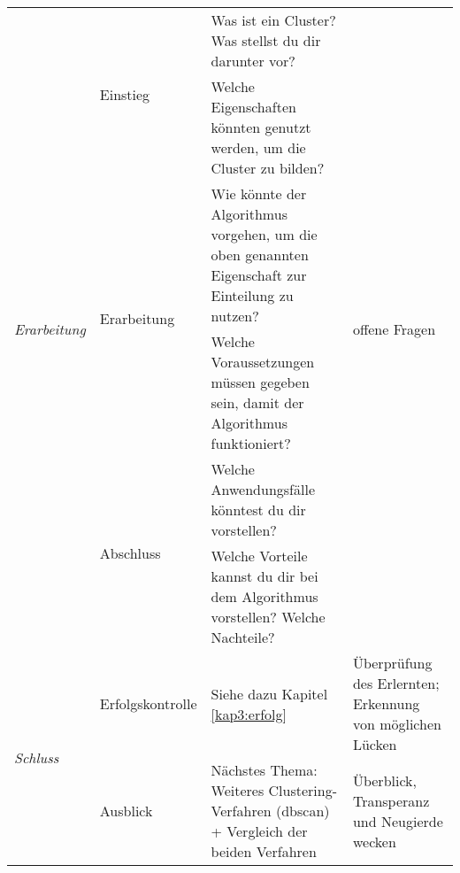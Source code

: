 \begin{longtable}[c]{@{}lp{3.5cm}p{4.5cm}p{4.0cm}@{}}
	\multirow{6}{*}{\textit{Erarbeitung}} & \multirow{2}{*}{Einstieg}     & Was ist ein Cluster? Was stellst du dir darunter vor?                                                                                                     & \multirow{6}{*}{offene Fragen}                                    \\* \cmidrule(lr){3-3}
	&                                              & Welche Eigenschaften könnten genutzt werden, um die Cluster zu bilden?                                                                                    &                                                                   \\* \cmidrule(lr){2-3}
	& \multirow{2}{*}{Erarbeitung} & Wie könnte der Algorithmus vorgehen, um die oben genannten Eigenschaft zur Einteilung zu nutzen?                                                          &                                                                   \\* \cmidrule(lr){3-3}
	&                                              & Welche Voraussetzungen müssen gegeben sein, damit der Algorithmus funktioniert?                                                                           &                                                                   \\* \cmidrule(lr){2-3}
	& \multirow{2}{*}{Abschluss}                   & Welche Anwendungsfälle könntest du dir vorstellen?                                                                                                        &                                                                   \\* \cmidrule(lr){3-3}
	&                                              & Welche Vorteile kannst du dir bei dem Algorithmus vorstellen? Welche Nachteile?                                                                           &                                                                   \\* \midrule
	\multirow{4}{*}{\textit{Schluss}}     & Erfolgskontrolle                             & Siehe dazu Kapitel \vref{kap3:erfolg}                                                                                                                                  & Überprüfung des Erlernten; Erkennung von möglichen Lücken         \\* \cmidrule(l){2-4} 
	& Ausblick                                     & Nächstes Thema: Weiteres Clustering-Verfahren (dbscan) + Vergleich der beiden Verfahren                                                                   & Überblick, Transperanz und Neugierde wecken                       \\* \cmidrule(l){2-4} 

\end{longtable}
